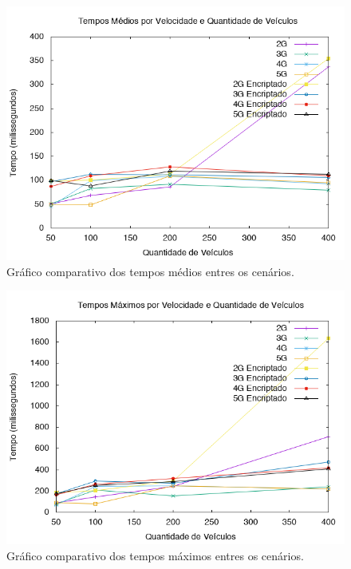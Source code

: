 \documentclass[
	12pt,				%
	oneside,			%
	a4paper,			%
	english,			%
	brazil				%
	]{abntex2ppgsi}
\begin{document}
\begin{figure}[h!]
	\centering
	\includegraphics[width=0.7\columnwidth]{images/grafico_tempo_medio.png}
	\caption{Gráfico comparativo dos tempos médios entres os cenários.}
	\label{fig:graficotempomedio}
\end{figure}

\begin{figure}[h!]
	\centering
	\includegraphics[width=0.7\columnwidth]{images/grafico_tempo_max.png}
	\caption{Gráfico comparativo dos tempos máximos entres os cenários.}
	\label{fig:graficotempomax}
\end{figure}

  
\end{document}
